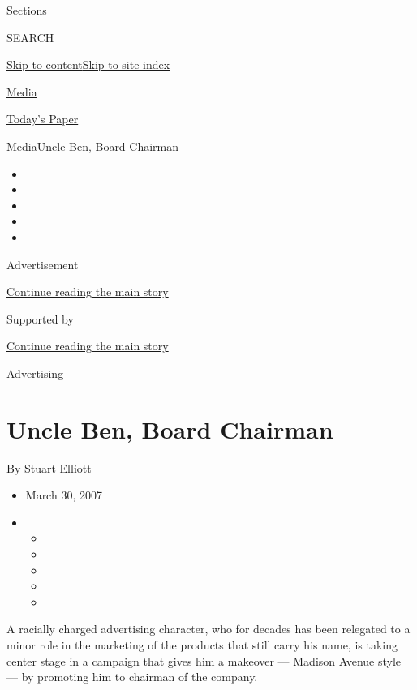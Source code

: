 Sections

SEARCH

\protect\hyperlink{site-content}{Skip to
content}\protect\hyperlink{site-index}{Skip to site index}

\href{https://www.nytimes3xbfgragh.onion/pages/business/media/index.html}{Media}

\href{https://myaccount.nytimes3xbfgragh.onion/auth/login?response_type=cookie\&client_id=vi}{}

\href{https://www.nytimes3xbfgragh.onion/section/todayspaper}{Today's
Paper}

\href{/pages/business/media/index.html}{Media}\textbar{}Uncle Ben, Board
Chairman

\begin{itemize}
\item
\item
\item
\item
\item
\end{itemize}

Advertisement

\protect\hyperlink{after-top}{Continue reading the main story}

Supported by

\protect\hyperlink{after-sponsor}{Continue reading the main story}

Advertising

\hypertarget{uncle-ben-board-chairman}{%
\section{Uncle Ben, Board Chairman}\label{uncle-ben-board-chairman}}

By \href{https://www.nytimes3xbfgragh.onion/by/stuart-elliott}{Stuart
Elliott}

\begin{itemize}
\item
  March 30, 2007
\item
  \begin{itemize}
  \item
  \item
  \item
  \item
  \item
  \end{itemize}
\end{itemize}

A racially charged advertising character, who for decades has been
relegated to a minor role in the marketing of the products that still
carry his name, is taking center stage in a campaign that gives him a
makeover --- Madison Avenue style --- by promoting him to chairman of
the company.

